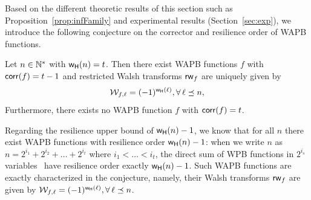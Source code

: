 \documentclass[11pt]{llncs}
\begin{document}
Based on the different theoretic results of this section such as Proposition~\ref{prop:infFamily} and experimental results (Section~\ref{sec:exp}), we introduce the following conjecture on the corrector and resilience order of WAPB functions.












\begin{conjecture}\label{conj:wapb-corr}
	Let $n\in \mathbb{N}^*$ with $\mathsf{w_H}(n)=t$. Then
	there exist WAPB functions $f$ with $\mathsf{corr}(f)=t-1$ and
	restricted Walsh transforms $\mathsf{rw}_{f}$ are uniquely given by
	\[
	\mathcal{W}_{f,\ell} = (-1)^{\mathsf{w_H}(\ell)}, \forall \, \ell \preceq n,
	\]  Furthermore,
	there exists no WAPB function $f$ with $\mathsf{corr}(f)=t$.
\end{conjecture}


\begin{remark}

	Regarding the resilience upper bound of $\mathsf{w_H}(n)-1$, we know that for all $n$ there exist WAPB functions with resilience order $\mathsf{w_H}(n)-1$:
	when we write $n$ as $n=2^{i_1}+2^{i_2}+\dots + 2^{i_t}$ where $i_1<\dots<i_{t}$,
	the direct sum of WPB functions in $2^{i_s}$ variables~\cite{DAM:ZhuSu22} have resilience order exactly $\mathsf{w_H}(n)-1$.
	Such WAPB functions are exactly characterized in the conjecture, namely, their Walsh transforms $\mathsf{rw}_{f}$ are given by
	\(\mathcal{W}_{f,\ell} = (-1)^{\mathsf{w_H}(\ell)}, \forall \, \ell \preceq n\).
\end{remark}
\end{document}
